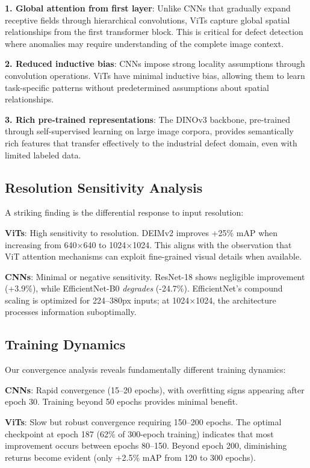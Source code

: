 \documentclass[journal,twoside,web]{ieeecolor}
\begin{document}
\textbf{1. Global attention from first layer}: Unlike CNNs that gradually expand receptive fields through hierarchical convolutions, ViTs capture global spatial relationships from the first transformer block. This is critical for defect detection where anomalies may require understanding of the complete image context.

\textbf{2. Reduced inductive bias}: CNNs impose strong locality assumptions through convolution operations. ViTs have minimal inductive bias, allowing them to learn task-specific patterns without predetermined assumptions about spatial relationships.

\textbf{3. Rich pre-trained representations}: The DINOv3 backbone, pre-trained through self-supervised learning on large image corpora, provides semantically rich features that transfer effectively to the industrial defect domain, even with limited labeled data.

\subsection{Resolution Sensitivity Analysis}

A striking finding is the differential response to input resolution:

\textbf{ViTs}: High sensitivity to resolution. DEIMv2 improves +25\% mAP when increasing from 640$\times$640 to 1024$\times$1024. This aligns with the observation that ViT attention mechanisms can exploit fine-grained visual details when available.

\textbf{CNNs}: Minimal or negative sensitivity. ResNet-18 shows negligible improvement (+3.9\%), while EfficientNet-B0 \textit{degrades} (-24.7\%). EfficientNet's compound scaling is optimized for 224--380px inputs; at 1024$\times$1024, the architecture processes information suboptimally.

\subsection{Training Dynamics}

Our convergence analysis reveals fundamentally different training dynamics:

\textbf{CNNs}: Rapid convergence (15--20 epochs), with overfitting signs appearing after epoch 30. Training beyond 50 epochs provides minimal benefit.

\textbf{ViTs}: Slow but robust convergence requiring 150--200 epochs. The optimal checkpoint at epoch 187 (62\% of 300-epoch training) indicates that most improvement occurs between epochs 80--150. Beyond epoch 200, diminishing returns become evident (only +2.5\% mAP from 120 to 300 epochs).
\end{document}
